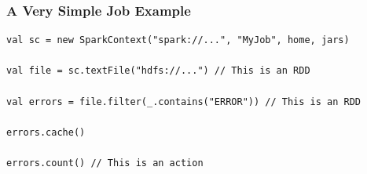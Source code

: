 \begin{frame}[fragile]
\frametitle{A Very Simple Job Example}


\begin{lstlisting}
val sc = new SparkContext("spark://...", "MyJob", home, jars) 

val file = sc.textFile("hdfs://...") // This is an RDD

val errors = file.filter(_.contains("ERROR")) // This is an RDD

errors.cache()

errors.count() // This is an action
\end{lstlisting}

\end{frame}


